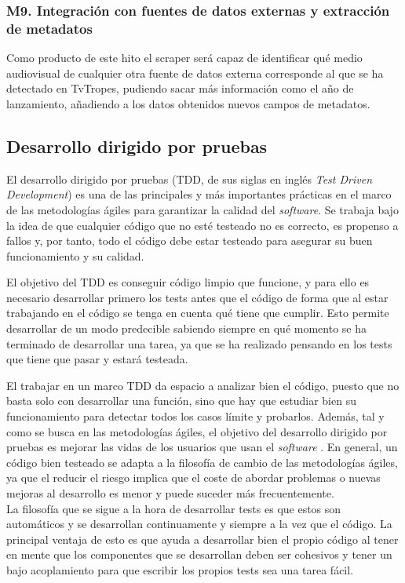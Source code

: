 \subsubsection{M9. Integración con fuentes de datos externas y extracción de metadatos}
Como producto de este hito el scraper será capaz de identificar qué medio
audiovisual de cualquier otra fuente de datos externa corresponde al que se ha
detectado en TvTropes, pudiendo sacar más información como el año de
lanzamiento, añadiendo a los datos obtenidos nuevos campos de metadatos.

\subsection{Desarrollo dirigido por pruebas}
El desarrollo dirigido por pruebas (TDD, de sus siglas en inglés \textit{Test
Driven Development}) es una de las principales y más importantes prácticas en el
marco de las metodologías ágiles para garantizar la calidad del
\textit{software}. Se trabaja bajo la idea de que cualquier código que no esté
testeado no es correcto, es propenso a fallos y, por tanto, todo el código debe
estar testeado para asegurar su buen funcionamiento y su calidad.

El objetivo del TDD es conseguir código limpio que funcione, y para ello es
necesario desarrollar primero los tests antes que el código de forma que al
estar trabajando en el código se tenga en cuenta qué tiene que cumplir. Esto
permite desarrollar de un modo predecible sabiendo siempre en qué momento se ha
terminado de desarrollar una tarea, ya que se ha realizado pensando en los tests
que tiene que pasar y estará testeada. 

El trabajar en un marco TDD da espacio a analizar bien el código, puesto que no
basta solo con desarrollar una función, sino que hay que estudiar bien su
funcionamiento para detectar todos los casos límite y probarlos. Además, tal y
como se busca en las metodologías ágiles, el objetivo del desarrollo dirigido
por pruebas es mejorar las vidas de los usuarios que usan el \textit{software}
\cite{beck2002driven}. En general, un código bien testeado se adapta a la
filosofía de cambio de las metodologías ágiles, ya que el reducir el riesgo
implica que el coste de abordar problemas o nuevas mejoras al desarrollo es
menor y puede suceder más frecuentemente.\\

La filosofía que se sigue a la hora de desarrollar tests es que estos son
automáticos y se desarrollan continuamente y siempre a la vez que el código. La
principal ventaja de esto es que ayuda a desarrollar bien el propio código al
tener en mente que los componentes que se desarrollan deben ser cohesivos y
tener un bajo acoplamiento para que escribir los propios tests sea una tarea
fácil.


